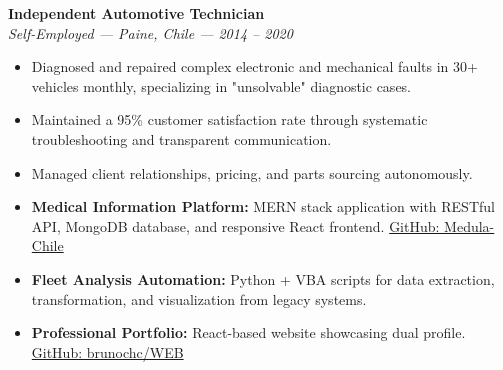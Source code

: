 \documentclass[10pt,letterpaper]{article}
\begin{document}
\vspace{0.2cm}

\noindent \textbf{Independent Automotive Technician} \\
\textit{Self-Employed — Paine, Chile — 2014 – 2020}
\begin{itemize}
    \item Diagnosed and repaired complex electronic and mechanical faults in 30+ vehicles monthly, specializing in "unsolvable" diagnostic cases.
    \item Maintained a 95\% customer satisfaction rate through systematic troubleshooting and transparent communication.
    \item Managed client relationships, pricing, and parts sourcing autonomously.
\end{itemize}

\vspace{0.4cm}


\vspace{0.3cm}

\begin{itemize}
    \item \textbf{Medical Information Platform:} MERN stack application with RESTful API, MongoDB database, and responsive React frontend. \href{https://github.com/Medula-Chile}{GitHub: Medula-Chile}
    \item \textbf{Fleet Analysis Automation:} Python + VBA scripts for data extraction, transformation, and visualization from legacy systems.
    \item \textbf{Professional Portfolio:} React-based website showcasing dual profile. \href{https://github.com/brunochc/WEB}{GitHub: brunochc/WEB}
\end{itemize}

\vspace{0.4cm}

\vspace{0.3cm}
\end{document}
